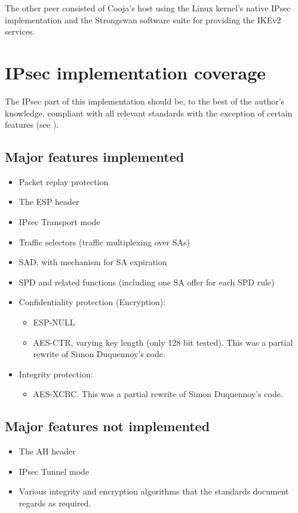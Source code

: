 \documentclass[final,a4paper,twoside,11pt,onecolumn]{report}
\begin{document}
The other peer consisted of Cooja's host using the Linux kernel's native IPsec implementation and the Strongswan software suite for providing the IKEv2 services.

\section{IPsec implementation coverage}
The IPsec part of this implementation should be, to the best of the author's knowledge, compliant with all relevant standards with the exception of certain features (see ).

\subsection{Major features implemented}
\begin{itemize}
   \item Packet replay protection
   \item The ESP header
   \item IPsec Transport mode
   \item Traffic selectors (traffic multiplexing over SAs)
   \item SAD, with mechanism for SA expiration
   \item SPD and related functions (including one SA offer for each SPD rule)
   \item Confidentiality protection (Encryption): 
   \begin{itemize}
      \item ESP-NULL
      \item AES-CTR, varying key length (only 128 bit tested). This was a partial rewrite of Simon Duquennoy's code.
   \end{itemize}
   \item Integrity protection:
   \begin{itemize}
           \item AES-XCBC. This was a partial rewrite of Simon Duquennoy's code.
   \end{itemize}
\end{itemize}

\subsection{Major features not implemented}
\label{sec:ipsec-features-not-imp}
\begin{itemize}
        \item The AH header
        \item IPsec Tunnel mode
        \item Various integrity and encryption algorithms that the standards document regards as required.
\end{itemize}
\end{document}
